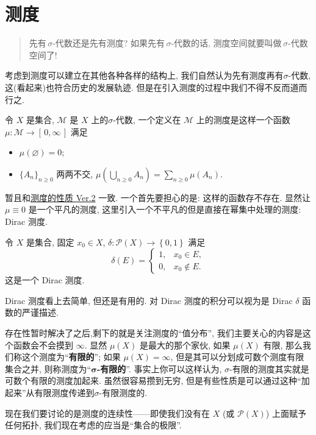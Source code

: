 \section{测\kern\ccwd 度}
\begin{quote}
    先有\,$\sigma $-代数还是先有测度? 如果先有\,$\sigma $-代数的话, 测度空间就要叫做\,$\sigma $-代数空间了!
\end{quote}
考虑到测度可以建立在其他各种各样的结构上, 我们自然认为先有测度再有\;$\sigma $-代数, 这(看起来)也符合历史的发展轨迹. 但是在引入测度的过程中我们不得不反而道而行之.

\begin{defi}
    令 $X$ 是集合, $\mathcal M$ 是 $X$ 上的$\sigma $-代数, 一个定义在 $\mathcal M$ 上的测度是这样一个函数 $\mu :\mathcal M\to [\,0,\infty\,]$ 满足
    \begin{itemize}
        \item $\mu (\varnothing)=0$;
        \item $\{A_n\}_{n\geqslant 0}$ 两两不交, $\mu (\bigcup_{n\geqslant 0} A_n) = \sum_{n\geqslant 0} \mu (A_n)$.
    \end{itemize}
\end{defi}
暂且和\hyperref[测度的性质]{测度的性质 Ver.2} 一致. 一个首先要担心的是: 这样的函数存不存在. 显然让 $\mu\equiv 0$ 是一个平凡的测度, 这里引入一个不平凡的但是直接在幂集中处理的测度: Dirac 测度.
\begin{defi}[Dirac 测度]
    令 $X$ 是集合, 固定 $x_0\in X$, $\delta:\mathcal P(X)\to \left\{ 0,1 \right\} $ 满足
    \[
        \delta (E)=\begin{cases}
            1, & x_0\in E,    \\
            0, & x_0\notin E.
        \end{cases}
    \]
    这是一个 Dirac 测度.
\end{defi}
Dirac 测度看上去简单, 但还是有用的. 对 Dirac 测度的积分可以视为是 Dirac $\delta $ 函数的严谨描述.

存在性暂时解决了之后,剩下的就是关注测度的``值分布'', 我们主要关心的内容是这个函数会不会摸到 $\infty$. 显然 $\mu (X)$ 是最大的那个家伙, 如果 $\mu (X)$ 有限, 那么我们称这个测度为``\textbf{有限的}''; 如果 $\mu (X)=\infty$, 但是其可以分划成可数个\enote 测度有限集合之并, 则称测度为``\textbf{$\boldsymbol\sigma $-有限的}''. 事实上你可以这样认为, $\sigma $-有限的测度其实就是可数个有限的测度加起来. 虽然很容易攒到无穷, 但是有些性质是可以通过这种``加起来''从有限测度传递到\;$\sigma $-有限测度的\enote\enote.


现在我们要讨论的是测度的连续性------即使我们没有在 $X$ (或 $\mathcal P(X)$) 上面赋予任何拓扑, 我们现在考虑的应当是``集合的极限''.

